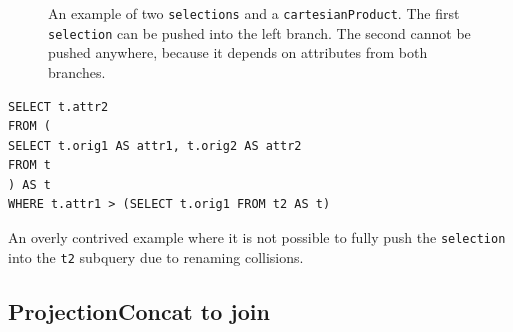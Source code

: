 \begin{figure}[htpb]
\begin{subfigure}[c]{194pt}
    \end{subfigure}
    
    \caption{An example of two \texttt{selections} and a \texttt{cartesianProduct}. The first \texttt{selection} can be pushed into the left branch. The second cannot be pushed anywhere, because it depends on attributes from both branches.}
\end{figure}

\begin{listing}[ht!]
    \begin{verbatim}
SELECT t.attr2
FROM (
SELECT t.orig1 AS attr1, t.orig2 AS attr2
FROM t
) AS t
WHERE t.attr1 > (SELECT t.orig1 FROM t2 AS t)
    \end{verbatim}
    \caption{An overly contrived example where it is not possible to fully push the \texttt{selection} into the \texttt{t2} subquery due to renaming collisions.}
    \label{fig:cannot-rename}
\end{listing}

\subsection{ProjectionConcat to join}

